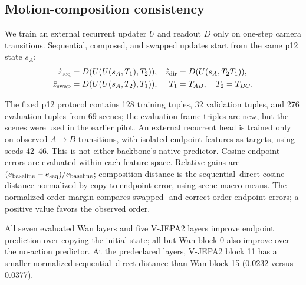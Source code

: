 \documentclass{article} %
\begin{document}
\subsection{Motion-composition consistency}
\label{sec:se3-diagnostic-details}
We train an external recurrent updater $U$ and readout $D$ only on one-step
camera transitions. Sequential, composed, and swapped updates start from
the same p12 state $s_A$:
\begin{equation}
\begin{aligned}
  \hat z_{\rm seq}&=D(U(U(s_A,T_1),T_2)), &
  \hat z_{\rm dir}&=D(U(s_A,T_2T_1)),\\
  \hat z_{\rm swap}&=D(U(U(s_A,T_2),T_1)), &
  T_1&=T_{AB},\quad T_2=T_{BC}.
\end{aligned}
\label{eq:se3-order-diagnostic}
\end{equation}


The fixed p12 protocol contains 128 training tuples, 32 validation tuples,
and 276 evaluation tuples from 69 scenes; the evaluation frame triples are
new, but the scenes were used in the earlier pilot. An external recurrent
head is trained only on observed $A\!\to\!B$ transitions, with isolated
endpoint features as targets, using seeds 42--46. This is not either
backbone's native predictor. Cosine endpoint errors are evaluated within
each feature space. Relative gains are $(e_{\rm baseline}-e_{\rm seq})/
e_{\rm baseline}$; composition distance is the sequential--direct cosine
distance normalized by copy-to-endpoint error, using scene-macro means.
The normalized order margin compares swapped- and correct-order endpoint
errors; a positive value favors the observed order.

All seven evaluated Wan layers and five V-JEPA2 layers improve endpoint
prediction over copying the initial state; all but Wan block 0 also
improve over the no-action predictor. At the predeclared layers,
V-JEPA2 block 11 has a smaller normalized sequential--direct distance
than Wan block 15 (0.0232 versus 0.0377).
\end{document}
